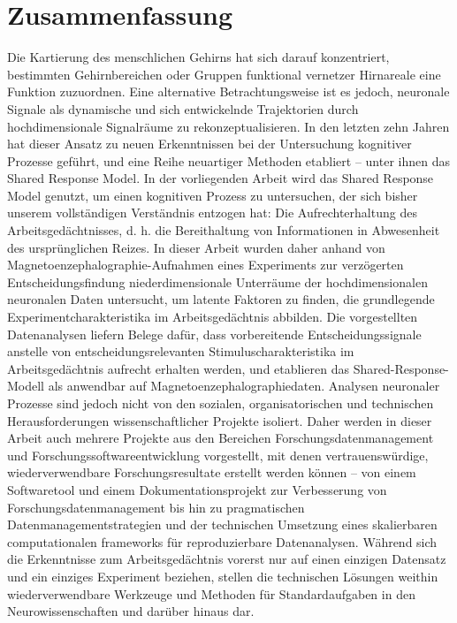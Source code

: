 \documentclass[
  a4paper,  %
  twoside,  %
  bibliography=totoc,
  headsepline,
  cleardoublepage=empty,
  parskip=half,
  draft=false
]{scrbook}
\begin{document}

\pagebreak
\section*{Zusammenfassung}

Die Kartierung des menschlichen Gehirns hat sich darauf konzentriert, bestimmten Gehirnbereichen oder Gruppen funktional vernetzer Hirnareale eine Funktion zuzuordnen.
Eine alternative Betrachtungsweise ist es jedoch, neuronale Signale als dynamische und sich entwickelnde Trajektorien durch  hochdimensionale Signalräume zu rekonzeptualisieren.
In den letzten zehn Jahren hat dieser Ansatz zu neuen Erkenntnissen bei der Untersuchung kognitiver Prozesse geführt, und
eine Reihe neuartiger Methoden etabliert -- unter ihnen das Shared Response Model.
In der vorliegenden Arbeit wird das Shared Response Model genutzt, um einen kognitiven Prozess zu untersuchen, der sich bisher unserem vollständigen Verständnis entzogen hat: Die Aufrechterhaltung des Arbeitsgedächtnisses, d. h. die Bereithaltung von Informationen in Abwesenheit des ursprünglichen Reizes.
In dieser Arbeit wurden daher anhand von Magnetoenzephalographie-Aufnahmen eines Experiments zur verzögerten Entscheidungsfindung  niederdimensionale Unterräume der hochdimensionalen neuronalen Daten untersucht, um latente Faktoren zu finden, die  grundlegende Experimentcharakteristika im Arbeitsgedächtnis abbilden.
Die vorgestellten Datenanalysen liefern Belege dafür, dass vorbereitende Entscheidungssignale anstelle von entscheidungsrelevanten Stimuluscharakteristika im Arbeitsgedächtnis aufrecht erhalten werden, und etablieren das Shared-Response-Modell als anwendbar auf Magnetoenzephalographiedaten.
Analysen neuronaler Prozesse sind jedoch nicht von den sozialen, organisatorischen und technischen Herausforderungen wissenschaftlicher Projekte isoliert.
Daher werden in dieser Arbeit auch mehrere Projekte aus den \mbox{Bereichen} Forschungsdatenmanagement und Forschungssoftwareentwicklung vorgestellt, mit denen vertrauenswürdige, wiederverwendbare Forschungsresultate erstellt werden können -- von einem Softwaretool und einem Dokumentationsprojekt zur Verbesserung von Forschungsdatenmanagement bis hin zu pragmatischen Datenmanagementstrategien und der technischen Umsetzung eines skalierbaren computationalen frameworks für  reproduzierbare Datenanalysen.
Während sich die Erkenntnisse zum Arbeitsgedächtnis vorerst nur auf einen einzigen Datensatz und ein einziges Experiment beziehen, stellen die technischen Lösungen weithin wiederverwendbare Werkzeuge und Methoden für Standardaufgaben in den Neurowissenschaften und darüber hinaus dar.
\end{document}
